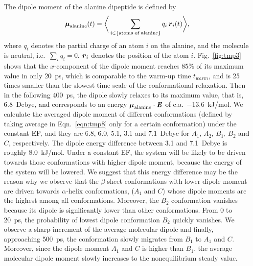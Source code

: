 \documentclass[a4paper,preprint,unsortedaddress,onecolumn]{revtex4-1}
\newcommand{\recheck}[1]{{\color{red} #1}}
\newcommand{\redc}[1]{{\color{red} #1}}
\newcommand{\vect}[1]{\textbf{\textit{#1}}}
\begin{document}
\redc{The dipole moment of the alanine dipeptide is defined by
\begin{align}\label{eqn:tmp8}
  \boldsymbol\mu_{\textrm{alanine}}(t) =
  \bigg\langle
  \sum_{i\in \{\textrm{atoms of alanine}\}}
  q_i\, \vect r_i(t)
  \bigg\rangle,
\end{align}
where $q_i$ denotes the partial charge of an atom $i$ on the alanine,
and the molecule is neutral, i.e.~$\sum_iq_i = 0$.
$\vect r_i$ denotes the position of the atom $i$.}
Fig.~\ref{fig:tmp3}
shows that the $x$-component of the dipole moment 
reaches 85\% of its maximum value in only 20~ps, which is comparable to
the warm-up time $t_{warm}$, and is 25 times
smaller than the slowest time scale of the conformational relaxation.
Then in the following 400~ps, the dipole slowly relaxes to its 
maximum value, that is, 
6.8~Debye, and  corresponds to an energy
\redc{$\boldsymbol\mu_{\textrm{alanine}} \cdot \vect E$}
of c.a.~$-13.6$~kJ/mol.
We calculate the averaged dipole moment of different conformations
\redc{(defined by taking average in Eqn.~\eqref{eqn:tmp8}
only for a certain conformation)}
under the constant EF, and they are 6.8, 6.0, 5.1, 3.1 and 7.1~Debye
for $A_1$, $A_2$, $B_1$, $B_2$ and $C$, respectively.
The dipole energy difference between 3.1 and 7.1~Debye is roughly 8.0~kJ/mol.
\recheck{Under a constant EF, the system will be likely to be driven towards those
conformations with higher dipole moment, because the
energy of the system will be lowered.  We suggest that this energy difference may be the reason why
we observe that the $\beta$-sheet conformations with lower dipole moment
are driven towards $\alpha$-helix conformations, 
($A_1$ and $C$) whose dipole moments are the highest
among all conformations. Moreover, the $B_2$ conformation vanishes because
its dipole is significantly lower than other conformations.}
From 0 to 20~ps, the probability of
lowest dipole conformation $B_2$ quickly
vanishes. We observe a sharp increment of the average molecular dipole and finally, approaching  500~ps, the conformation slowly migrates from
$B_1$ to $A_1$ and $C$. Moreover, since the dipole moment $A_1$ and $C$
is higher than $B_1$, the average molecular dipole moment slowly increases
to the nonequilibrium steady value.
\end{document}
